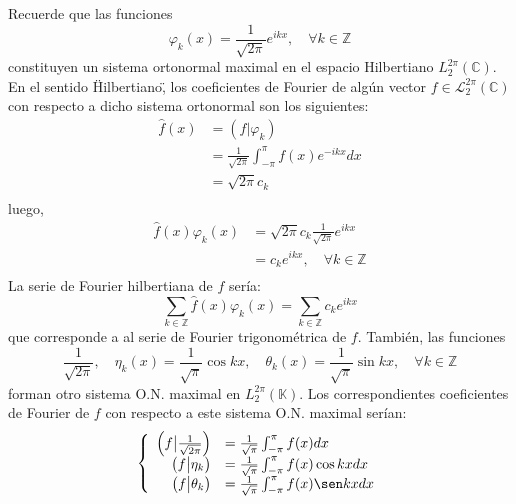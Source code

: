 \documentclass[12pt]{report}
\theoremstyle{largebreak}
\newcommand\pint[2]{\ensuremath{\left(#1\big| #2\right)}}
\begin{document}
    Recuerde que las funciones
    \begin{equation*}
        \varphi_k(x)=\frac{1}{\sqrt{2\pi}}e^{ ikx},\quad\forall k\in\mathbb{Z}
    \end{equation*}
    constituyen un sistema ortonormal maximal en el espacio Hilbertiano $L_2^{2\pi}(\mathbb{C})$. En el sentido \"Hilbertiano\", los coeficientes de Fourier de algún vector $f\in\mathcal{L}_2^{2\pi}(\mathbb{C})$ con respecto a dicho sistema ortonormal son los siguientes:
    \begin{equation*}
        \begin{split}
            \hat{f}(x)&=\pint{f}{\varphi_k}\\
            &=\frac{1}{\sqrt{2\pi}}\int_{-\pi}^{\pi}f(x)e^{ -ikx}dx\\
            &=\sqrt{2\pi}c_k\\
        \end{split}
    \end{equation*}
    luego, 
    \begin{equation*}
        \begin{split}
            \hat{f}(x)\varphi_k(x)&=\sqrt{2\pi}c_k\frac{1}{\sqrt{2\pi}}e^{ ikx}\\
            &=c_ke^{ ikx},\quad\forall k\in\mathbb{Z}\\
        \end{split}
    \end{equation*}
    La serie de Fourier hilbertiana de $f$ sería:
    \begin{equation*}
        \sum_{ k\in\mathbb{Z}}\hat{f}(x)\varphi_k(x)=\sum_{k\in\mathbb{Z}}c_ke^{ ikx}
    \end{equation*}
    que corresponde a al serie de Fourier trigonométrica de $f$. También, las funciones
    \begin{equation*}
        \frac{1}{\sqrt{2\pi}},\quad \eta_k(x)=\frac{1}{\sqrt{\pi}}\cos kx,\quad\theta_k(x)=\frac{1}{\sqrt{\pi}}\sin kx,\quad \forall k\in\mathbb{Z}
    \end{equation*}
    forman otro sistema O.N. maximal en $L_2^{2\pi}(\mathbb{K})$. Los correspondientes coeficientes de Fourier de $f$ con respecto a este sistema O.N. maximal serían:
    \begin{equation*}
        \left\{
            \begin{array}{rl}
                \pint{f}{\frac{1}{\sqrt{2\pi}}}&=\frac{1}{\sqrt{\pi}}\int_{-\pi}^{\pi}f(x)dx\\
                \pint{f}{\eta_k}&=\frac{1}{\sqrt{\pi}}\int_{-\pi}^{\pi}f(x)\cos kxdx \\
                \pint{f}{\theta_k}&=\frac{1}{\sqrt{\pi}}\int_{-\pi}^{\pi}f(x)\sen kxdx \\
            \end{array}
        \right.
    \end{equation*}
\end{document}
